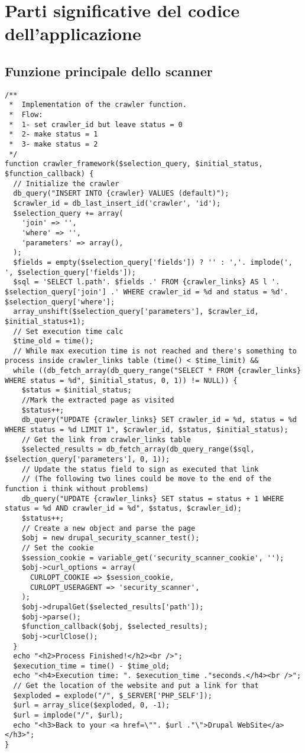 \chapter{Parti significative del codice dell'applicazione}
\section{Funzione principale dello scanner}
\begin{lstlisting}
/**
 *  Implementation of the crawler function.
 *  Flow: 
 *  1- set crawler_id but leave status = 0
 *  2- make status = 1
 *  3- make status = 2
 */
function crawler_framework($selection_query, $initial_status, $function_callback) {
  // Initialize the crawler
  db_query("INSERT INTO {crawler} VALUES (default)");
  $crawler_id = db_last_insert_id('crawler', 'id');
  $selection_query += array(
    'join' => '',
    'where' => '',
    'parameters' => array(),
  );
  $fields = empty($selection_query['fields']) ? '' : ','. implode(', ', $selection_query['fields']);
  $sql = 'SELECT l.path'. $fields .' FROM {crawler_links} AS l '. $selection_query['join'] .' WHERE crawler_id = %d and status = %d'. $selection_query['where'];
  array_unshift($selection_query['parameters'], $crawler_id, $initial_status+1);
  // Set execution time calc
  $time_old = time();
  // While max execution time is not reached and there's something to process inside crawler_links table (time() < $time_limit) && 
  while ((db_fetch_array(db_query_range("SELECT * FROM {crawler_links} WHERE status = %d", $initial_status, 0, 1)) != NULL)) {
    $status = $initial_status;
    //Mark the extracted page as visited
    $status++;
    db_query("UPDATE {crawler_links} SET crawler_id = %d, status = %d WHERE status = %d LIMIT 1", $crawler_id, $status, $initial_status);
    // Get the link from crawler_links table
    $selected_results = db_fetch_array(db_query_range($sql, $selection_query['parameters'], 0, 1));
    // Update the status field to sign as executed that link
    // (The following two lines could be move to the end of the function i think without problems) 
    db_query("UPDATE {crawler_links} SET status = status + 1 WHERE status = %d AND crawler_id = %d", $status, $crawler_id);
    $status++;
    // Create a new object and parse the page
    $obj = new drupal_security_scanner_test();
    // Set the cookie
    $session_cookie = variable_get('security_scanner_cookie', '');
    $obj->curl_options = array(
      CURLOPT_COOKIE => $session_cookie,
      CURLOPT_USERAGENT => 'security_scanner',
    );
    $obj->drupalGet($selected_results['path']);
    $obj->parse();
    $function_callback($obj, $selected_results);
    $obj->curlClose();
  }
  echo "<h2>Process Finished!</h2><br />";
  $execution_time = time() - $time_old;
  echo "<h4>Execution time: ". $execution_time ."seconds.</h4><br />";
  // Get the location of the website and put a link for that
  $exploded = explode("/", $_SERVER['PHP_SELF']);
  $url = array_slice($exploded, 0, -1);
  $url = implode("/", $url);
  echo "<h3>Back to your <a href=\"". $url ."\">Drupal WebSite</a></h3>";
}
\end{lstlisting}
